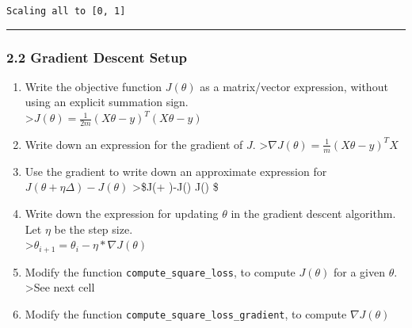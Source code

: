 \documentclass{article}
\begin{document}
    \begin{Verbatim}[commandchars=\\\{\}]
Scaling all to [0, 1]
    \end{Verbatim}

    \begin{center}\rule{0.5\linewidth}{\linethickness}\end{center}

\subsubsection{2.2 Gradient Descent Setup}\label{gradient-descent-setup}

\begin{enumerate}
\def\labelenumi{\arabic{enumi}.}
\item
  Write the objective function \(J(\theta)\) as a matrix/vector
  expression, without using an explicit summation
  sign.\\\textgreater{}\(J(\theta)=\frac{1}{2m}(X\theta - y)^T(X\theta - y)\)
\item
  Write down an expression for the gradient of \(J\).
  \textgreater{}\(\nabla J(\theta) = \frac{1}{m}(X\theta - y)^TX\)
\item
  Use the gradient to write down an approximate expression for
  \(J(\theta + \eta \Delta)-J(\theta)\) \textgreater{}\$J(\theta +
  \eta \Delta)-J(\theta) \approx \nabla J(\theta) \Delta \eta \$
\item
  Write down the expression for updating \(\theta\) in the gradient
  descent algorithm. Let \(\eta\) be the step
  size.\\\textgreater{}\(\theta_{i+1} = \theta_i - \eta * \nabla J(\theta)\)
\item
  Modify the function \texttt{compute\_square\_loss}, to compute
  \(J(\theta)\) for a given \(\theta\). \textgreater{}See next cell
\item
  Modify the function \texttt{compute\_square\_loss\_gradient}, to
  compute \(\nabla J(\theta)\)
\end{enumerate}
\end{document}
